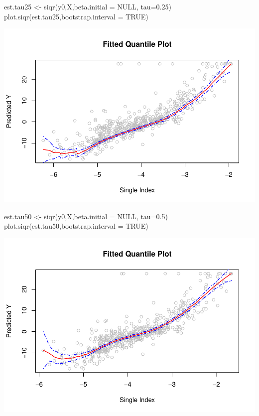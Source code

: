 \begin{Schunk}
\begin{Sinput}
est.tau25 <- siqr(y0,X,beta.initial = NULL, tau=0.25)
plot.siqr(est.tau25,bootstrap.interval = TRUE)
\end{Sinput}

\includegraphics{siqr_files/figure-latex/unnamed-chunk-2-1} \end{Schunk}

\begin{Schunk}
\begin{Sinput}
est.tau50 <- siqr(y0,X,beta.initial = NULL, tau=0.5)
plot.siqr(est.tau50,bootstrap.interval = TRUE)
\end{Sinput}

\includegraphics{siqr_files/figure-latex/unnamed-chunk-3-1} \end{Schunk}

